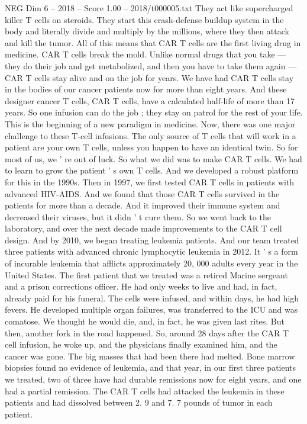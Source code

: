\begin{textsample}{NEG Dim 6 – 2018 – Score 1.00 – 2018/t000005.txt}
They act like supercharged killer T cells on steroids.
They start this crash-defense buildup system in the body and literally divide and multiply by the millions, where they then attack and kill the tumor.
All of this means that CAR T cells are the first living drug in medicine.
CAR T cells break the mold.
Unlike normal drugs that you take — they do their job and get metabolized, and then you have to take them again — CAR T cells stay alive and on the job for years.
We have had CAR T cells stay in the bodies of our cancer patients now for more than eight years.
And these designer cancer T cells, CAR T cells, have a calculated half-life of more than 17 years.
So one infusion can do the job ; they stay on patrol for the rest of your life.
This is the beginning of a new paradigm in medicine.
Now, there was one major challenge to these T-cell infusions.
The only source of T cells that will work in a patient are your own T cells, unless you happen to have an identical twin.
So for most of us, we ' re out of luck.
So what we did was to make CAR T cells.
We had to learn to grow the patient ' s own T cells.
And we developed a robust platform for this in the 1990s.
Then in 1997, we first tested CAR T cells in patients with advanced HIV-AIDS.
And we found that those CAR T cells survived in the patients for more than a decade.
And it improved their immune system and decreased their viruses, but it didn ' t cure them.
So we went back to the laboratory, and over the next decade made improvements to the CAR T cell design.
And by 2010, we began treating leukemia patients.
And our team treated three patients with advanced chronic lymphocytic leukemia in 2012.
It ' s a form of incurable leukemia that afflicts approximately 20, 000 adults every year in the United States.
The first patient that we treated was a retired Marine sergeant and a prison corrections officer.
He had only weeks to live and had, in fact, already paid for his funeral.
The cells were infused, and within days, he had high fevers.
He developed multiple organ failures, was transferred to the ICU and was comatose.
We thought he would die, and, in fact, he was given last rites.
But then, another fork in the road happened.
So, around 28 days after the CAR T cell infusion, he woke up, and the physicians finally examined him, and the cancer was gone.
The big masses that had been there had melted.
Bone marrow biopsies found no evidence of leukemia, and that year, in our first three patients we treated, two of three have had durable remissions now for eight years, and one had a partial remission.
The CAR T cells had attacked the leukemia in these patients and had dissolved between 2. 9 and 7. 7 pounds of tumor in each patient.

\end{textsample}
